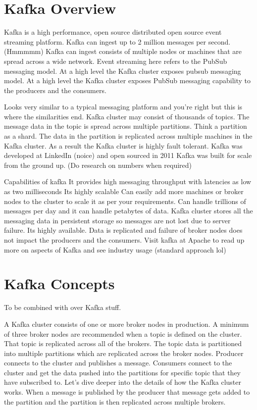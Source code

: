 \section{Kafka Overview}

Kafka is a high performance, open source distributed open source event streaming platform.
Kafka can ingest up to 2 million messages per second. (Hmmmmm)
Kafka can ingest consists of multiple nodes or machines that are spread across a wide network.
Event streaming here refers to the PubSub messaging model.
At a high level the Kafka cluster exposes pubsub messaging model.
At a high level the Kafka cluster exposes PubSub messaging capability to the producers and the consumers.

Looks very similar to a typical messaging platform and you're right but this is where the similarities end.
Kafka cluster may consist of thousands of topics.
The message data in the topic is spread across multiple partitions.
Think a partition as a shard.
The data in the partition is replicated across multiple machines in the Kafka cluster.
As a result the Kafka cluster is highly fault tolerant.
Kafka was developed at LinkedIn (noice) and open sourced in 2011
Kafka was built for scale from the ground up. (Do research on numbers when required)

Capabilities of kafka
It provides high messaging throughput with latencies as low as two milliseconds
Its highly scalable
Can easily add more machines or broker nodes to the cluster to scale it as per your requirements.
Can handle trillions of messages per day and it can handle petabytes of data.
Kafka cluster stores all the messaging data in persistent storage so messages are not lost due to server failure.
Its highly available.
Data is replicated and failure of broker nodes does not impact the producers and the consumers.
Visit kafka at Apache to read up more on aspects of Kafka and see industry usage (standard approach lol)


\section{Kafka Concepts}
To be combined with over Kafka stuff.

A Kafka cluster consists of one or more broker nodes in production.
A minimum of three broker nodes are recommended when a topic is defined on the cluster.
That topic is replicated across all of the brokers.
The topic data is partitioned into multiple partitions which are replicated across the broker nodes.
Producer connects to the cluster and publishes a message.
Consumers connect to the cluster and get the data pushed into the partitions for specific topic that they have subscribed to.
Let's dive deeper into the details of how the Kafka cluster works.
When a message is published by the producer that message gets added to the partition and the partition is then replicated across multiple brokers.

